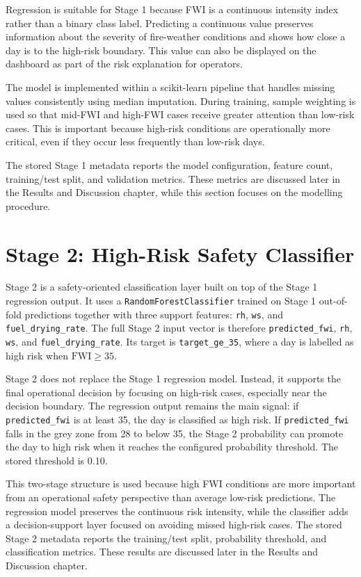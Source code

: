 Regression is suitable for Stage 1 because FWI is a continuous intensity index
rather than a binary class label. Predicting a continuous value preserves
information about the severity of fire-weather conditions and shows how close a
day is to the high-risk boundary. This value can also be displayed on the
dashboard as part of the risk explanation for operators.

The model is implemented within a scikit-learn pipeline that handles missing
values consistently using median imputation. During training, sample weighting
is used so that mid-FWI and high-FWI cases receive greater attention than
low-risk cases. This is important because high-risk conditions are
operationally more critical, even if they occur less frequently than low-risk
days.

The stored Stage 1 metadata reports the model configuration, feature count,
training/test split, and validation metrics. These metrics are discussed later
in the Results and Discussion chapter, while this section focuses on the
modelling procedure.

\section{Stage 2: High-Risk Safety Classifier}

Stage 2 is a safety-oriented classification layer built on top of the Stage 1
regression output. It uses a \texttt{RandomForestClassifier} trained on Stage 1
out-of-fold predictions together with three support features:
\texttt{rh}, \texttt{ws}, and \texttt{fuel\_drying\_rate}. The full Stage 2
input vector is therefore \texttt{predicted\_fwi}, \texttt{rh}, \texttt{ws},
and \texttt{fuel\_drying\_rate}. Its target is \texttt{target\_ge\_35}, where
a day is labelled as high risk when \( \mathrm{FWI} \geq 35 \).

Stage 2 does not replace the Stage 1 regression model. Instead, it supports the
final operational decision by focusing on high-risk cases, especially near the
decision boundary. The regression output remains the main signal: if
\texttt{predicted\_fwi} is at least 35, the day is classified as high risk. If
\texttt{predicted\_fwi} falls in the grey zone from 28 to below 35, the Stage 2
probability can promote the day to high risk when it reaches the configured
probability threshold. The stored threshold is 0.10.

This two-stage structure is used because high FWI conditions are more important
from an operational safety perspective than average low-risk predictions. The
regression model preserves the continuous risk intensity, while the classifier
adds a decision-support layer focused on avoiding missed high-risk cases. The
stored Stage 2 metadata reports the training/test split, probability threshold,
and classification metrics. These results are discussed later in the Results
and Discussion chapter.

